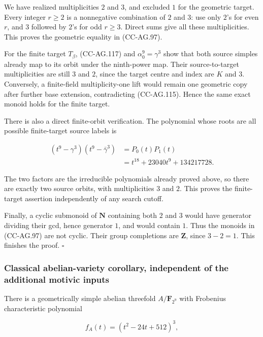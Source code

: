 We have realized multiplicities \(2\) and \(3\), and excluded \(1\) for
the geometric target. Every integer \(r\ge2\) is a nonnegative
combination of \(2\) and \(3\): use only \(2\)'s for even \(r\), and
\(3\) followed by \(2\)'s for odd \(r\ge3\). Direct sums give all these
multiplicities. This proves the geometric equality in (CC-AG.97).

For the finite target \(T_\beta\), (CC-AG.117) and
\(\alpha_0^9=\gamma^3\) show that both source simples already map to its
orbit under the ninth-power map. Their source-to-target multiplicities
are still \(3\) and \(2\), since the target centre and index are \(K\)
and \(3\). Conversely, a finite-field multiplicity-one lift would remain
one geometric copy after further base extension, contradicting
(CC-AG.115). Hence the same exact monoid holds for the finite target.

There is also a direct finite-orbit verification. The polynomial whose
roots are all possible finite-target source labels is

\[
 \begin{aligned}
 (t^9-\gamma^3)(t^9-\bar\gamma^3)
 &=P_0(t)P_1(t)\\
 &=t^{18}+23040t^9+134217728.
 \end{aligned}
 \tag{CC-AG.121}
\]

The two factors are the irreducible polynomials already proved above, so
there are exactly two source orbits, with multiplicities \(3\) and
\(2\). This proves the finite-target assertion independently of any
search cutoff.

Finally, a cyclic submonoid of \(\mathbf N\) containing both \(2\) and
\(3\) would have generator dividing their gcd, hence generator \(1\),
and would contain \(1\). Thus the monoids in (CC-AG.97) are not cyclic.
Their group completions are \(\mathbf Z\), since \(3-2=1\). This
finishes the proof. \(\square\)

\subsubsection{Classical abelian-variety corollary, independent of the
additional motivic
inputs}\label{classical-abelian-variety-corollary-independent-of-the-additional-motivic-inputs}

There is a geometrically simple abelian threefold \(A/\mathbf F_{2^9}\)
with Frobenius characteristic polynomial

\[
 f_A(t)=(t^2-24t+512)^3,
 \tag{CC-AG.122}
\]

